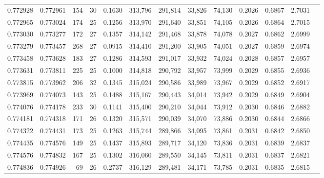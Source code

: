\begin{tabular}{rrrrrrrrrrrrr}
0.772928 & 0.772961 &   154 &  30 &                                     0.1630 & 313,796 & 291,814 &  33,826 &  74,130 & 0.2026 & 0.6867 & 2.7031 \\
0.772965 & 0.773024 &   174 &  25 &                                     0.1256 & 313,970 & 291,640 &  33,851 &  74,105 & 0.2026 & 0.6864 & 2.7015 \\
0.773030 & 0.773277 &   172 &  27 &                                     0.1357 & 314,142 & 291,468 &  33,878 &  74,078 & 0.2027 & 0.6862 & 2.6999 \\
0.773279 & 0.773457 &   268 &  27 &                                     0.0915 & 314,410 & 291,200 &  33,905 &  74,051 & 0.2027 & 0.6859 & 2.6974 \\
0.773458 & 0.773628 &   183 &  27 &                                     0.1286 & 314,593 & 291,017 &  33,932 &  74,024 & 0.2028 & 0.6857 & 2.6957 \\
0.773631 & 0.773811 &   225 &  25 &                                     0.1000 & 314,818 & 290,792 &  33,957 &  73,999 & 0.2029 & 0.6855 & 2.6936 \\
0.773815 & 0.773962 &   206 &  32 &                                     0.1345 & 315,024 & 290,586 &  33,989 &  73,967 & 0.2029 & 0.6852 & 2.6917 \\
0.773969 & 0.774073 &   143 &  25 &                                     0.1488 & 315,167 & 290,443 &  34,014 &  73,942 & 0.2029 & 0.6849 & 2.6904 \\
0.774076 & 0.774178 &   233 &  30 &                                     0.1141 & 315,400 & 290,210 &  34,044 &  73,912 & 0.2030 & 0.6846 & 2.6882 \\
0.774181 & 0.774318 &   171 &  26 &                                     0.1320 & 315,571 & 290,039 &  34,070 &  73,886 & 0.2030 & 0.6844 & 2.6866 \\
0.774322 & 0.774431 &   173 &  25 &                                     0.1263 & 315,744 & 289,866 &  34,095 &  73,861 & 0.2031 & 0.6842 & 2.6850 \\
0.774435 & 0.774576 &   149 &  25 &                                     0.1437 & 315,893 & 289,717 &  34,120 &  73,836 & 0.2031 & 0.6839 & 2.6837 \\
0.774576 & 0.774832 &   167 &  25 &                                     0.1302 & 316,060 & 289,550 &  34,145 &  73,811 & 0.2031 & 0.6837 & 2.6821 \\
0.774836 & 0.774926 &    69 &  26 &                                     0.2737 & 316,129 & 289,481 &  34,171 &  73,785 & 0.2031 & 0.6835 & 2.6815 \\

\end{tabular}

